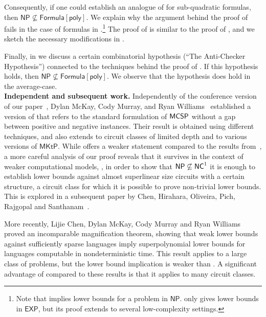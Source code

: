 \documentclass{toc}
\newcommand{\NC}{\ensuremath{{\sf NC}^1}\xspace}
\newcommand{\NP}{\ensuremath{{\sf NP}}\xspace}
\newcommand{\MCSP}{\ensuremath{{\sf MCSP}}\xspace}
\begin{document}
Consequently, if one could establish an analogue of  for sub-quadratic formulas, then $\mathsf{NP} \nsubseteq \mathsf{Formula}[\mathsf{poly}]$. We explain why the argument behind the proof of  fails in the case of formulas in .\footnote{Note that  implies lower bounds for a problem in $\mathsf{NP}$.   only gives lower bounds in $\mathsf{EXP}$, but its proof extends to several low-complexity settings.} The proof of  is similar to the proof of , and we sketch the necessary modifications in .


Finally, in  we discuss a certain combinatorial hypothesis (``The Anti-Checker Hypothesis'') connected to the techniques behind the proof of . If this hypothesis holds, then $\mathsf{NP} \nsubseteq \mathsf{Formula}[\mathsf{poly}]$. We observe that the hypothesis does hold in the average-case.\\

%
\noindent \textbf{Independent and subsequent work.}  %
%
%
%
Independently of the conference version of our paper~\cite{conf-version},
%
Dylan McKay, Cody Murray, and Ryan Williams~\cite{STOC_paper} established a version of  that refers to the standard formulation of \MCSP without a gap between positive and negative instances. Their result is obtained using  different techniques, and also extends to circuit classes of limited depth and to various versions of $\mathsf{MKtP}$. While  offers a weaker statement compared to the results from~\cite{STOC_paper}, a more careful analysis of our proof reveals that it survives in the context of weaker computational models, \eg, in order to show that $\NP\not\subseteq\NC$ it is enough to establish lower bounds against almost superlinear size circuits with a certain structure, a circuit class for which it is possible to prove non-trivial lower bounds. This is explored in a subsequent
%
paper by %
Chen, Hirahara, Oliveira, Pich, Rajgopal and Santhanam~\cite{chen_et_al:LIPIcs:2020:11755}.

More recently, Lijie Chen, Dylan McKay, Cody Murray and Ryan Williams~\cite{CCC_paper} proved an incomparable magnification theorem, showing that weak lower bounds against sufficiently sparse languages imply superpolynomial lower bounds for languages computable in nondeterministic time. This result applies to a large class of problems, but the lower bound implication is weaker than . A significant advantage of  compared to these results is that it applies to many circuit classes.
\end{document}
